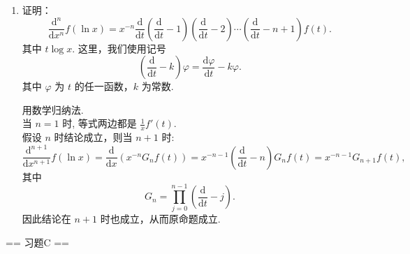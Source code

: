\begin{enumerate}
    \item[9.]证明：
    \[
        \frac{\mathrm{d}^n}{\mathrm{d}x^n}f(\ln x)=x^{-n}\frac{\mathrm{d}}{\mathrm{d}t}\left( \frac{\mathrm{d}}{\mathrm{d}t}-1 \right)\left( \frac{\mathrm{d}}{\mathrm{d}t}-2 \right)\cdots\left( \frac{\mathrm{d}}{\mathrm{d}t}-n+1 \right)f(t).
    \]
    其中 $t\log x$. 这里，我们使用记号
    \[
        \left( \frac{\mathrm{d}}{\mathrm{d}t}-k \right)\varphi=\frac{\mathrm{d}\varphi}{\mathrm{d}t}-k\varphi.
    \]
    其中 $\varphi$ 为 $t$ 的任一函数，$k$ 为常数.
    \begin{solution}
        用数学归纳法.\\
        当 $n=1$ 时, 等式两边都是 $\displaystyle\frac{1}{x} f'(t)$. \\
        假设 $n$ 时结论成立，则当 $n+1$ 时:
        \[
        \frac{\mathrm{d}^{n+1}}{\mathrm{d}x^{n+1}} f(\ln x) = \frac{\mathrm{d}}{\mathrm{d}x} \left( x^{-n} G_n f(t) \right) = x^{-n-1} \left( \frac{\mathrm{d}}{\mathrm{d}t} - n \right) G_n f(t) = x^{-n-1} G_{n+1} f(t),
        \]
        其中
        \[
        G_n = \prod_{j=0}^{n-1} \left( \frac{\mathrm{d}}{\mathrm{d}t} - j \right).
        \]
        因此结论在 $n+1$ 时也成立，从而原命题成立.
    \end{solution}
\end{enumerate}

== 习题C ==

